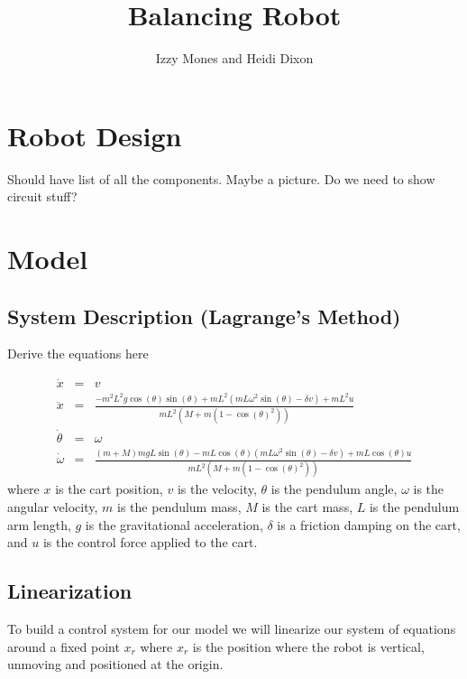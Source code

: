 \documentclass[]{article}
\title{Balancing Robot}
\author{Izzy Mones and Heidi Dixon}
\begin{document}
	\maketitle

\section*{Robot Design}
Should have list of all the components. Maybe a picture. Do we need to show circuit stuff?

\section*{Model}
\subsection*{System Description (Lagrange's Method)}
Derive the equations here

\begin{eqnarray}
	\dot{x} & = & v \\
	\ddot{x}          & = & \frac{-m^2L^2g \cos(\theta)\sin(\theta) + mL^2(mL\omega^2 \sin(\theta)-\delta v)+mL^2u }{mL^2(M+m(1-\cos(\theta)^2))} \\
	\dot{\theta}  &= & \omega \\
	\dot{\omega}  &= & \frac{(m+M)mgL\sin(\theta)-mL\cos(\theta)(mL\omega^2\sin(\theta)-\delta v)+mL\cos(\theta)u}{mL^2(M+m(1-\cos(\theta)^2))}
\end{eqnarray}
where $x$ is the cart position, $v$ is the velocity, $\theta$ is the pendulum angle, $\omega$ is the angular velocity, $m$ is the pendulum mass, $M$ is the cart mass, $L$ is the pendulum arm length, $g$ is the gravitational acceleration, $\delta$ is a friction damping on the cart, and $u$ is the control force applied to the cart.


\subsection*{Linearization}
To build a control system for our model we will linearize our system of equations around a fixed point $x_r$ where $x_r$ is the position where the robot is vertical, unmoving and positioned at the origin.  
\end{document}
